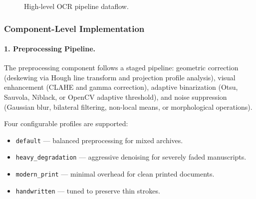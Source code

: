 \documentclass[12pt,a4paper]{article}
\begin{document}
\begin{figure}[H]
  \centering
  \caption{High-level OCR pipeline dataflow.}
\end{figure}

\subsubsection{Component-Level Implementation}

\paragraph{1. Preprocessing Pipeline.}

The preprocessing component follows a staged pipeline: geometric
correction (deskewing via Hough line transform and projection profile
analysis), visual enhancement (CLAHE and gamma correction), adaptive
binarization (Otsu, Sauvola, Niblack, or OpenCV adaptive threshold),
and noise suppression (Gaussian blur, bilateral filtering, non-local
means, or morphological operations).

Four configurable profiles are supported:
\begin{itemize}
  \item \texttt{default} --- balanced preprocessing for mixed
    archives.
  \item \texttt{heavy\_degradation} --- aggressive denoising for
    severely faded manuscripts.
  \item \texttt{modern\_print} --- minimal overhead for clean printed
    documents.
  \item \texttt{handwritten} --- tuned to preserve thin strokes.
\end{itemize}
\end{document}
